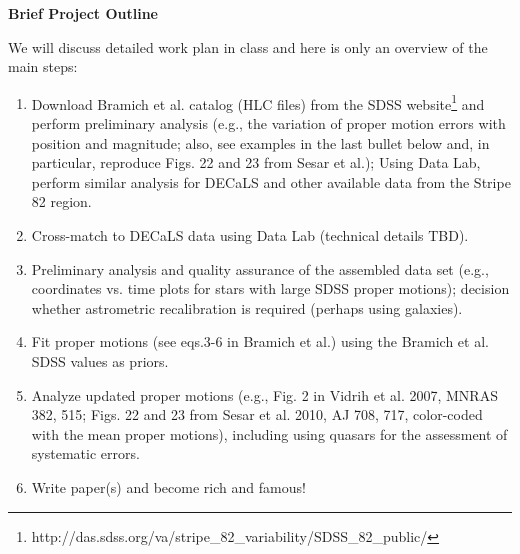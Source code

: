 \documentclass[10pt]{article}
\begin{document}
\vskip 0.2in
\newpage
{\bf Brief Project Outline}

We will discuss detailed work plan in class and here is only an overview of the
main steps: 
\begin{enumerate}
\item Download Bramich et al. catalog (HLC files) from the SDSS
website\footnote{http://das.sdss.org/va/stripe\_82\_variability/SDSS\_82\_public/}
and perform preliminary analysis (e.g., the variation of proper motion errors with 
 position and magnitude; also, see examples in the last bullet below and, in particular,
    reproduce Figs. 22 and 23 from Sesar et al.); Using Data Lab, perform similar analysis
     for DECaLS and other available data from the Stripe 82 region.
\item Cross-match to DECaLS data using Data Lab (technical details TBD). 
\item Preliminary analysis and quality assurance of the assembled data set (e.g., 
          coordinates vs. time plots for stars with large SDSS proper motions); 
          decision whether astrometric recalibration is required (perhaps using galaxies). 
\item Fit proper motions (see eqs.3-6 in Bramich et al.)  using the Bramich et al. SDSS values as priors. 
\item Analyze updated proper motions (e.g., Fig. 2 in Vidrih et al. 2007, MNRAS 382, 515;
   Figs. 22 and 23 from Sesar et al. 2010, AJ 708, 717, color-coded with the mean proper 
   motions), including using quasars for the assessment of systematic errors. 
\item Write paper(s) and become rich and famous! 
\end{enumerate}
\end{document}
